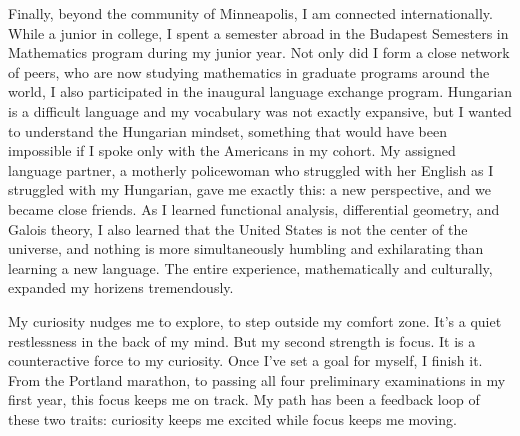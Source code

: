 \documentclass[12pt]{article}
\begin{document}
Finally, beyond the community of Minneapolis, I am connected internationally. While a junior in college, I spent a semester abroad in the Budapest Semesters in Mathematics program during my junior year. Not only did I form a close network of peers, who are now studying mathematics in graduate programs around the world, I also participated in the inaugural language exchange program. Hungarian is a difficult language and my vocabulary was not exactly expansive, but I wanted to understand the Hungarian mindset, something that would have been impossible if I spoke only with the Americans in my cohort. My assigned language partner, a motherly policewoman who struggled with her English as I struggled with my Hungarian, gave me exactly this: a new perspective, and we became close friends. As I learned functional analysis, differential geometry, and Galois theory, I also learned that the United States is not the center of the universe, and nothing is more simultaneously humbling and exhilarating than learning a new language. The entire experience, mathematically and culturally, expanded my horizens tremendously. 

My curiosity nudges me to explore, to step outside my comfort zone. It's a quiet restlessness in the back of my mind. But my second strength is focus. It is a counteractive force to my curiosity. Once I've set a goal for myself, I finish it. From the Portland marathon, to passing all four preliminary examinations in my first year, this focus keeps me on track. My path has been a feedback loop of these two traits: curiosity keeps me excited while focus keeps me moving. 
\end{document}
